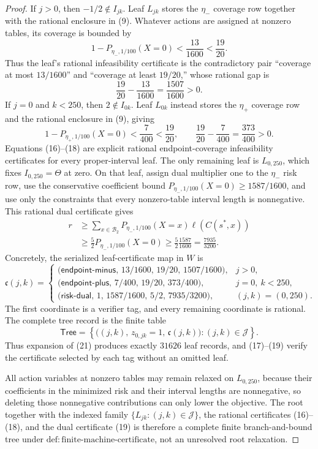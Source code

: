 \documentclass{article}
\begin{document}
\begin{proof}
If \(j>0\), then \(-1/2\notin I_{jk}\). Leaf \(L_{jk}\) stores the \(\eta_-\) coverage row together with the rational enclosure in (9). Whatever actions are assigned at nonzero tables, its coverage is bounded by
\[
 1-P_{\eta_-,1/100}(X=0)<\frac{13}{1600}<\frac{19}{20}.
\tag{16}
\]
Thus the leaf's rational infeasibility certificate is the contradictory pair ``coverage at most \(13/1600\)'' and ``coverage at least \(19/20\),'' whose rational gap is
\[
 \frac{19}{20}-\frac{13}{1600}=\frac{1507}{1600}>0.
\tag{17}
\]
If \(j=0\) and \(k<250\), then \(2\notin I_{0k}\). Leaf \(L_{0k}\) instead stores the \(\eta_+\) coverage row and the rational enclosure in (9), giving
\[
 1-P_{\eta_+,1/100}(X=0)<\frac7{400}<\frac{19}{20},
 \qquad
 \frac{19}{20}-\frac7{400}=\frac{373}{400}>0.
\tag{18}
\]
Equations (16)--(18) are explicit rational endpoint-coverage infeasibility certificates for every proper-interval leaf. The only remaining leaf is \(L_{0,250}\), which fixes \(I_{0,250}=\Theta\) at zero. On that leaf, assign dual multiplier one to the \(\eta_-\) risk row, use the conservative coefficient bound \(P_{\eta_-,1/100}(X=0)\ge1587/1600\), and use only the constraints that every nonzero-table interval length is nonnegative. This rational dual certificate gives
\[
 \begin{aligned}
 r
 &\ge \sum_{x\in\mathcal B_2}
 P_{\eta_-,1/100}(X=x)\ell(C(s^*,x))\\
 &\ge \frac52 P_{\eta_-,1/100}(X=0)
 \ge\frac52\frac{1587}{1600}
 =\frac{7935}{3200}.
\end{aligned}
\tag{19}
\]
Concretely, the serialized leaf-certificate map in \(W\) is
\[
 \mathfrak c(j,k)=
 \begin{cases}
 \bigl(\mathsf{endpoint\text{-}minus},\,13/1600,\,19/20,\,1507/1600\bigr),
   &j>0,\\
 \bigl(\mathsf{endpoint\text{-}plus},\,7/400,\,19/20,\,373/400\bigr),
   &j=0,\ k<250,\\
 \bigl(\mathsf{risk\text{-}dual},\,1,\,1587/1600,\,5/2,\,7935/3200\bigr),
   &(j,k)=(0,250).
 \end{cases}
\tag{20}
\]
The first coordinate is a verifier tag, and every remaining coordinate is rational. The complete tree record is the finite table
\[
 \mathsf{Tree}
 =\left\{\bigl((j,k),\,z_{0,jk}=1,\,\mathfrak c(j,k)\bigr):
 (j,k)\in\mathscr J\right\}.
\tag{21}
\]
Thus expansion of (21) produces exactly \(31626\) leaf records, and (17)--(19) verify the certificate selected by each tag without an omitted leaf.

All action variables at nonzero tables may remain relaxed on \(L_{0,250}\), because their coefficients in the minimized risk and their interval lengths are nonnegative, so deleting those nonnegative contributions can only lower the objective. The root together with the indexed family \(\{L_{jk}:(j,k)\in\mathscr J\}\), the rational certificates (16)--(18), and the dual certificate (19) is therefore a complete finite branch-and-bound tree under \(\mathrm{def{:}finite\text{-}machine\text{-}certificate}\), not an unresolved root relaxation.


\end{proof}
\end{document}
